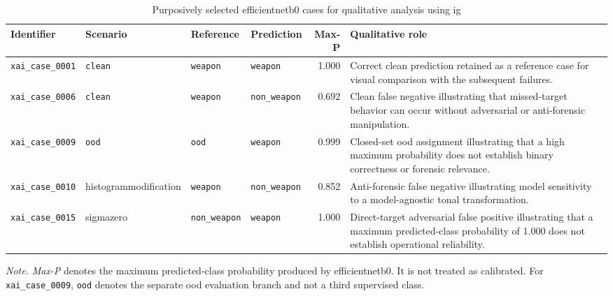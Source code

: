\begin{table}[htbp]
\centering
\scriptsize
\renewcommand{\arraystretch}{1.15}
\setlength{\tabcolsep}{3.2pt}
\caption{Purposively selected \gls{efficientnetb0} cases for qualitative analysis
using \gls{ig}}
\label{tab:results-xai-cases}
\begin{tabularx}{\textwidth}{@{}
p{}
p{}
p{}
p{}
r
X
@{}}
\toprule
\textbf{Identifier} &
\textbf{Scenario} &
\textbf{Reference} &
\textbf{Prediction} &
\textbf{Max-P} &
\textbf{Qualitative role} \\
\midrule

\texttt{xai\_case\_0001}
& \texttt{clean}
& \texttt{weapon}
& \texttt{weapon}
& 1.000
& Correct clean prediction retained as a reference case for visual comparison
with the subsequent failures. \\

\texttt{xai\_case\_0006}
& \texttt{clean}
& \texttt{weapon}
& \texttt{non\_weapon}
& 0.692
& Clean false negative illustrating that missed-target behavior can occur without
adversarial or anti-forensic manipulation. \\

\texttt{xai\_case\_0009}
& \texttt{ood}
& \texttt{ood}
& \texttt{weapon}
& 0.999
& Closed-set \gls{ood} assignment illustrating that a high maximum probability
does not establish binary correctness or forensic relevance. \\

\texttt{xai\_case\_0010}
& \gls{histogrammodification}
& \texttt{weapon}
& \texttt{non\_weapon}
& 0.852
& Anti-forensic false negative illustrating model sensitivity to a
model-agnostic tonal transformation. \\

\texttt{xai\_case\_0015}
& \gls{sigmazero}
& \texttt{non\_weapon}
& \texttt{weapon}
& 1.000
& Direct-target adversarial false positive illustrating that a maximum
predicted-class probability of 1.000 does not establish operational
reliability. \\

\bottomrule
\end{tabularx}

\vspace{0.4em}
\footnotesize
\textit{Note.} \textit{Max-P} denotes the maximum predicted-class probability
produced by \gls{efficientnetb0}. It is not treated as calibrated. For
\texttt{xai\_case\_0009}, \texttt{ood} denotes the separate \gls{ood}
evaluation branch and not a third supervised class.
\end{table}

